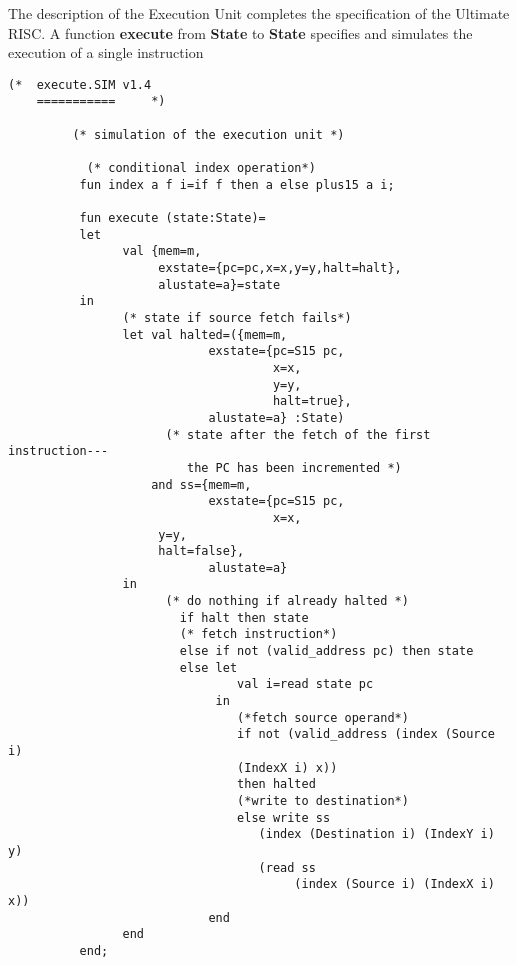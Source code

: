 The description of the Execution Unit completes the specification  of the Ultimate RISC.
A function {\bf execute} from {\bf State} to {\bf State} specifies and simulates the execution of a single instruction
\begin{verbatim}
(*	execute.SIM	v1.4
	===========		*)

         (* simulation of the execution unit *) 
           
           (* conditional index operation*)
          fun index a f i=if f then a else plus15 a i; 
           
          fun execute (state:State)= 
          let 
                val {mem=m, 
                     exstate={pc=pc,x=x,y=y,halt=halt}, 
                     alustate=a}=state 
          in 
                (* state if source fetch fails*)
                let val halted=({mem=m, 
                            exstate={pc=S15 pc, 
                                     x=x, 
                                     y=y, 
                                     halt=true}, 
                            alustate=a} :State)
                      (* state after the fetch of the first instruction---
                         the PC has been incremented *)
                    and ss={mem=m, 
                            exstate={pc=S15 pc, 
                                     x=x,
				     y=y,
				     halt=false}, 
                            alustate=a} 
                in 
                      (* do nothing if already halted *)
                        if halt then state 
                        (* fetch instruction*)
                        else if not (valid_address pc) then state 
                        else let 
                                val i=read state pc 
                             in 
                                (*fetch source operand*)
                                if not (valid_address (index (Source i)
          						(IndexX i) x)) 
                                then halted  
                                (*write to destination*)
                                else write ss 
                                   (index (Destination i) (IndexY i) y) 
                                   (read ss  
                                        (index (Source i) (IndexX i) x)) 
                            end 
                end 
          end; 

\end{verbatim}
